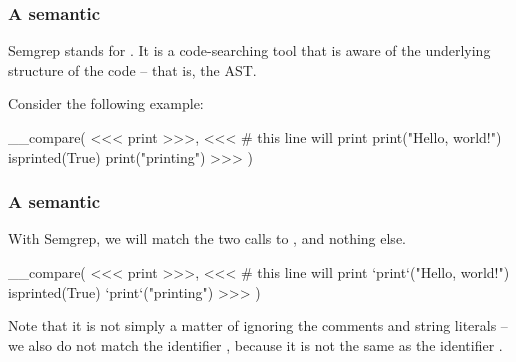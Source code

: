 \documentclass[aspectratio=169, handout]{beamer}
\begin{document}
\begin{frame}[fragile]
  \frametitle{A semantic }

  Semgrep stands for . It is a code-searching tool that is aware
  of the underlying structure of the code -- that is, the AST.

  \pause
  \vspace{\fill}

  Consider the following example:

  \vspace{5pt}

__compare(
<<<
  print
>>>,
<<<
    # this line will print
    print("Hello, world!")
    isprinted(True)
    print("printing")
>>>
)
\end{frame}

\begin{frame}[fragile]
  \frametitle{A semantic }

  With Semgrep, we will match the two calls to , and nothing else.

  \vspace{\fill}

__compare(
<<<
  print
>>>,
<<<
    # this line will print
    `print`("Hello, world!")
    isprinted(True)
    `print`("printing")
>>>
)

  \pause
  \vspace{\fill}

  Note that it is not simply a matter of ignoring the comments and string literals -- we
  also do not match the identifier , because it is not the same as the
  identifier .
\end{frame}
\end{document}
